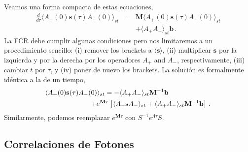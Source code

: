 \documentclass[twocolumn,aps,eqsecnum]{revtex4}
\begin{document}
Veamos una forma compacta de estas ecuaciones, 
%
\begin{eqnarray}
\frac{d}{d\tau} \langle A_+(0) \mathbf{s}(\tau) A_-(0) \rangle_{st} 
	&=& \mathbf{M} \langle A_+(0) \mathbf{s}(\tau) A_-(0) \rangle_{st} 
	\nonumber \\ 
	&& +\langle A_+ A_- \rangle_{st} \mathbf{b}	\,.   	
\end{eqnarray}
La FCR debe cumplir algunas condiciones pero nos limitaremos a un 
procedimiento sencillo: (i) remover los brackets a 
$\langle \mathbf{s} \rangle$, (ii) multiplicar $\mathbf{s}$ por la izquierda y 
por la derecha por los operadores $A_+$  and $A_-$, respectivamente, 
(iii) cambiar $t$ por $\tau$, y (iv) poner de nuevo los brackets. La soluci\'on 
es formalmente id\'entica a la de un tiempo, 
%
\begin{eqnarray}
\lefteqn{  \langle A_+(0) \mathbf{s}(\tau) A_-(0) \rangle_{st} 
	= -\langle A_+ A_- \rangle_{st} \mathbf{M}^{-1} \mathbf{b} } 
	\hspace{20mm}	 	\nonumber \\
&& +e^{ \mathbf{M} \tau } \left[ \langle A_+ \mathbf{s} A_- \rangle_{st} 
	 +\langle A_+ A_- \rangle_{st} \mathbf{M}^{-1} \mathbf{b} \right] \,. 
	 \nonumber \\
\end{eqnarray}
Similarmente, podemos reemplazar $e^{ \mathbf{M} \tau }$ con 
$S^{-1} e^{\Lambda \tau} S$. 

\subsection{Correlaciones de Fotones} 	%
\end{document}
